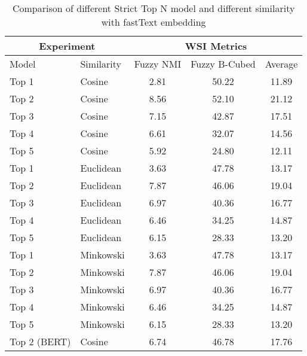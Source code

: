 \begin{table}[htbp!]
    \centering
    \begin{tabular}{llccc}
    \toprule
        \multicolumn{2}{c}{Experiment}  & \multicolumn{3}{c}{WSI Metrics}           \\
    \midrule
        Model       & Similarity        & Fuzzy NMI     & Fuzzy B-Cubed  & Average  \\
    \midrule
        Top 1       & Cosine            & 2.81          & 50.22          & 11.89    \\
        Top 2       & Cosine            & 8.56          & 52.10          & 21.12    \\
        Top 3       & Cosine            & 7.15          & 42.87          & 17.51    \\
        Top 4       & Cosine            & 6.61          & 32.07          & 14.56    \\
        Top 5       & Cosine            & 5.92          & 24.80          & 12.11    \\
        Top 1       & Euclidean         & 3.63          & 47.78          & 13.17    \\
        Top 2       & Euclidean         & 7.87          & 46.06          & 19.04    \\
        Top 3       & Euclidean         & 6.97          & 40.36          & 16.77    \\
        Top 4       & Euclidean         & 6.46          & 34.25          & 14.87    \\
        Top 5       & Euclidean         & 6.15          & 28.33          & 13.20    \\
        Top 1       & Minkowski         & 3.63          & 47.78          & 13.17    \\
        Top 2       & Minkowski         & 7.87          & 46.06          & 19.04    \\
        Top 3       & Minkowski         & 6.97          & 40.36          & 16.77    \\
        Top 4       & Minkowski         & 6.46          & 34.25          & 14.87    \\
        Top 5       & Minkowski         & 6.15          & 28.33          & 13.20    \\
        Top 2 (BERT)& Cosine            & 6.74          & 46.78          & 17.76    \\
    \bottomrule
    \end{tabular}
\caption{Comparison of different Strict Top N model and different similarity with fastText embedding}
\label{tab:different_similarity}
\end{table}